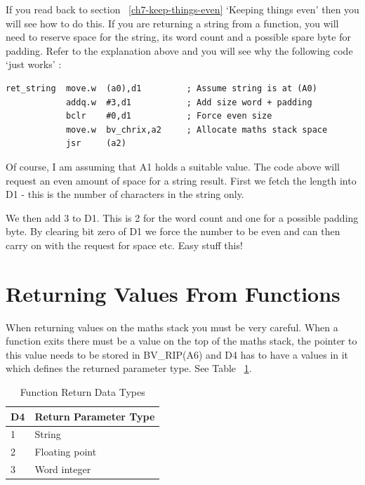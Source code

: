 If you read back to section ~\ref{ch7-keep-things-even} `Keeping things
      even' then you will see how to do this. If you are returning a string
      from a function, you will need to reserve space for the string, its
      word count and a possible spare byte for padding. Refer to the
      explanation above and you will see why the following code `just works'
     :

\begin{lstlisting}[firstnumber=1,]
ret_string  move.w  (a0),d1         ; Assume string is at (A0)
            addq.w  #3,d1           ; Add size word + padding
            bclr    #0,d1           ; Force even size
            move.w  bv_chrix,a2     ; Allocate maths stack space
            jsr     (a2)
\end{lstlisting}

Of course, I am assuming that A1 holds a suitable value. The code
      above will request an even amount of space for a string result. First we
      fetch the length into D1 -{} this is the number of characters in the
      string only.

We then add 3 to D1. This is 2 for the word count and one for a
      possible padding byte. By clearing bit zero of D1 we force the number to
      be even and can then carry on with the request for space etc. Easy stuff
      this!

\section{Returning Values From Functions}
\label{ch7-returning-values}%

When returning values on the maths stack you must be very careful.
    When a function exits there must be a value on the top of the maths stack,
    the pointer to this value needs to be stored in BV\_RIP(A6) and D4 has to
    have a values in it which defines the returned parameter type. See Table ~\ref{tab:FunctionReturnDataTypes}.

\begin{table}[htbp]
\centering
\begin{tabular}{l l}  %
\toprule
\textbf{D4} & \textbf{Return Parameter Type} \\
\midrule
%
1 & String\\
2 & Floating point\\
3 & Word integer\\%
\bottomrule
\end{tabular}
\caption{Function Return Data Types}
\label{tab:FunctionReturnDataTypes}
\end{table}

